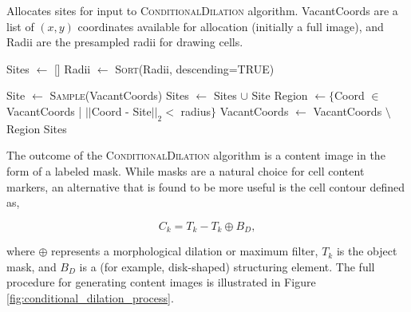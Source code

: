\begin{algorithm}
\caption{Allocates sites for input to \textsc{ConditionalDilation} algorithm. VacantCoords are a list of $(x, y)$ coordinates available for allocation (initially a full image), and Radii are the presampled radii for drawing cells.} \label{alg:AllocateSites}
\begin{algorithmic}[1]
\State Sites $\leftarrow$ []
\State Radii $\leftarrow$ \textsc{Sort}(Radii, descending=TRUE)

	\State Site $\leftarrow$ \textsc{Sample}(VacantCoords)
	\State Sites $\leftarrow$ Sites $\cup$ Site
	\State Region $\leftarrow \{$Coord $\in$ VacantCoords | $||$Coord - Site$||_2 <$ radius$\}$
	\State VacantCoords $\leftarrow$ VacantCoords $\setminus$ Region
\EndFor
\State\Return Sites
\EndProcedure
\end{algorithmic}
\end{algorithm}

The outcome of the \textsc{ConditionalDilation} algorithm is a content image in the form of a labeled mask. While masks are a natural choice for cell content markers, an alternative that is found to be more useful is the cell contour defined as,

\begin{equation}
C_k = T_k - T_k \oplus B_D,
\label{eq:contour}
\end{equation}

where $\oplus$ represents a morphological dilation or maximum filter, $T_k$ is the object mask, and $B_D$ is a (for example, disk-shaped) structuring element. The full procedure for generating content images is illustrated in Figure \ref{fig:conditional_dilation_process}.

